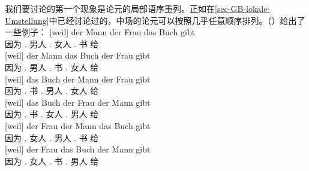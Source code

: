 我们要讨论的第一个现象是论元的局部语序重列。正如在\ref{sec-GB-lokale-Umstellung}中已经讨论过的，中场的论元可以按照几乎任意顺序排列。（）给出了一些例子：
\eal
\label{bsp-GPSG-anordnung}
\ex 
\gll {}[weil] der Mann der Frau das Buch gibt\\
     {}\spacebr{}因为 .\nom{} 男人 .\dat{} 女人 .\acc{} 书 给\\
\ex 
\gll {}[weil] der Mann das Buch der Frau gibt\\
     {}\spacebr{}因为 .\nom{} 男人 .\acc{} 书 .\dat{} 女人 给\\
\ex 
\gll {}[weil] das Buch der Mann der Frau gibt\\
{}\spacebr{}因为 .\acc{} 书 .\nom{} 男人 .\dat{} 女人 给\\
\ex 
\gll {}[weil] das Buch der Frau der Mann gibt\\
{}\spacebr{}因为 .\acc{} 书 .\dat{} 女人 .\nom{} 男人 给\\
\ex 
\gll {}[weil] der Frau der Mann das Buch gibt\\
{}\spacebr{}因为 .\dat{} 女人 .\nom{} 男人 .\acc{} 书 给\\
\ex 
\gll {}[weil] der Frau das Buch der Mann gibt\\
{}\spacebr{}因为 .\dat{} 女人 .\acc{} 书 .\nom{} 男人 给\\
\zl
\addlines

